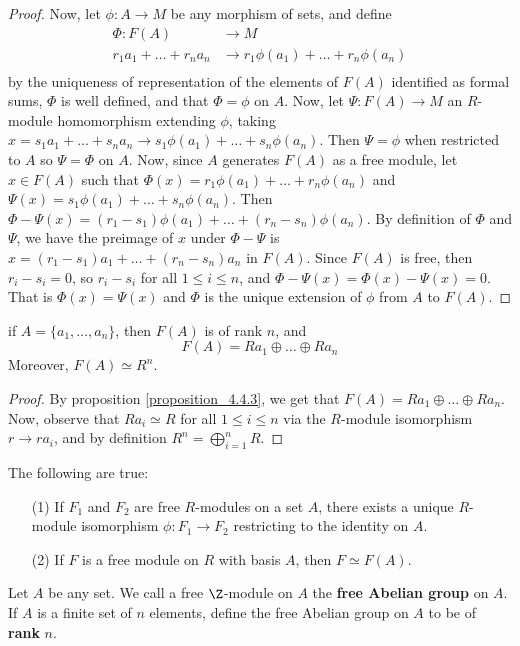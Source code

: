 \begin{proof}
  Now, let  $\phi:A \xrightarrow{} M$ be any morphism of sets, and
  define
  \begin{align*}
    \Phi: F(A) & \xrightarrow{} M \\
          r_1a_1+\dots+r_na_n & \xrightarrow{} r_1\phi(a_1)+\dots+r_n\phi(a_n) \\
  \end{align*}
  by the uniqueness of representation of the elements of $F(A)$
  identified as formal sums, $\Phi$ is well defined, and that
  $\Phi=\phi$ on $A$.  Now, let $\Psi:F(A) \xrightarrow{} M$ an
  $R$-module homomorphism extending $\phi$, taking $x=s_1a_1+\dots+s_na_n \xrightarrow{}
  s_1\phi(a_1)+\dots+s_n\phi(a_n)$. Then $\Psi=\phi$ when restricted
  to $A$ so $\Psi=\Phi$ on $A$. Now, since $A$ generates $F(A)$ as a
  free module, let $x \in F(A)$ such that
  $\Phi(x)=r_1\phi(a_1)+\dots+r_n\phi(a_n)$ and
  $\Psi(x)=s_1\phi(a_1)+\dots+s_n\phi(a_n)$. Then
  $\Phi-\Psi(x)=(r_1-s_1)\phi(a_1)+\dots+(r_n-s_n)\phi(a_n)$. By
  definition of $\Phi$ and  $\Psi$, we have the preimage of $x$ under
  $\Phi-\Psi$ is $x=(r_1-s_1)a_1+\dots+(r_n-s_n)a_n$ in $F(A)$. Since
  $F(A)$ is free, then $r_i-s_i=0$, so $r_i-s_i$ for all $1 \leq i
  \leq n$, and $\Phi-\Psi(x)=\Phi(x)-\Psi(x)=0$. That is
  $\Phi(x)=\Psi(x)$ and $\Phi$ is the unique extension of $\phi$ from
  $A$ to  $F(A)$.
\end{proof}
\begin{corollary}
if $A=\{a_1, \dots, a_n\}$, then $F(A)$ is of rank $n$, and
  \begin{equation*}
    F(A)=Ra_1 \oplus \dots \oplus Ra_n
  \end{equation*}
  Moreover, $F(A) \simeq R^n$.
\end{corollary}
\begin{proof}
  By proposition \ref{proposition_4.4.3}, we get that $F(A)=Ra_1
  \oplus \dots \oplus Ra_n$. Now, observe that $Ra_i \simeq R$ for all
  $1 \leq i \leq n$ via the $R$-module isomorphism  $r \xrightarrow{}
  ra_i$, and by definition $R^n=\bigoplus_{i=1}^n{R}$.
\end{proof}
\begin{corollary}
  The following are true:
  \begin{enumerate}
    \item[(1)] If $F_1$ and $F_2$ are free $R$-modules on a set  $A$,
      there exists a unique  $R$-module isomorphism $\phi:F_1
      \xrightarrow{} F_2$ restricting to the identity on $A$.

    \item[(2)] If $F$ is a free module on $R$ with basis $A$, then  $F
      \simeq F(A)$.
  \end{enumerate}
\end{corollary}

\begin{definition}
  Let $A$ be any set. We call a free $\Z$-module on $A$ the
  \textbf{free Abelian group} on $A$. If  $A$ is a finite set of  $n$
  elements, define the free Abelian group on $A$ to be of
  \textbf{rank} $n$.
\end{definition}
